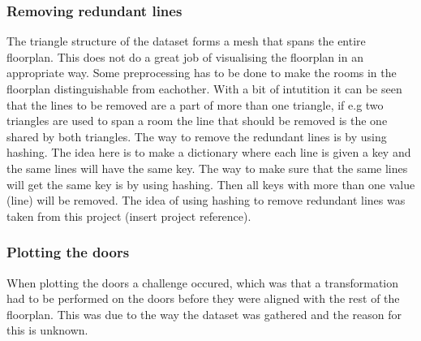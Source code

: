 \subsubsection{Removing redundant lines}
The triangle structure of the dataset forms a mesh that spans the entire floorplan. This does not do a great job of visualising the floorplan in an appropriate way. Some preprocessing has to be done to make the rooms in the floorplan distinguishable from eachother. With a bit of intutition it can be seen that the lines to be removed are a part of more than one triangle, if e.g two triangles are used to span a room the line that should be removed is the one shared by both triangles. The way to remove the redundant lines is by using hashing. The idea here is to make a dictionary where each line is given a key and the same lines will have the same key. The way to make sure that the same lines will get the same key is by using hashing. Then all keys with more than one value (line) will be removed. The idea of using hashing to remove redundant lines was taken from this project (insert project reference).

\subsubsection{Plotting the doors}
When plotting the doors a challenge occured, which was that a transformation had to be performed on the doors before they were aligned with the rest of the floorplan. 
This was due to the way the dataset was gathered and the reason for this is unknown. 


